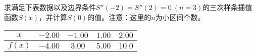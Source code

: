 \documentclass[11pt]{article}
\begin{document}
\maketitle

\thispagestyle{empty}

\newpage

\begin{question}

	\questiontext
	{
		求满足下表数据以及边界条件$S''(-2) = S''(2) = 0\ (n = 3)$的三次样条插值函数$S(x)$，并计算$S(0)$的值。注意：这里的$n$为小区间个数。
		\begin{table}[h]
			\centering
			\begin{tabular}{|c|c|c|c|c|}
				\hline
				$x$    & $-2.00$ & $-1.00$ & $1.00$ & $2.00$ \\ \hline
				$f(x)$ & $-4.00$ & $3.00$  & $5.00$ & $10.0$ \\ \hline
			\end{tabular}
		\end{table}
	}


\end{question}
\end{document}
